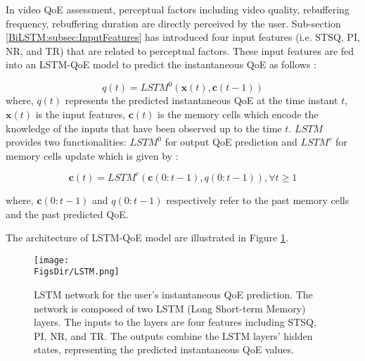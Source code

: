 In video QoE assessment, perceptual factors \citep{Survey_QoE} including video quality, rebuffering frequency, rebuffering duration are directly perceived by the user.
Sub-section \ref{BiLSTM:subsec:InputFeatures} has introduced four input features (i.e. STSQ, PI, NR, and TR) that are related to perceptual factors.
These input features are fed into an LSTM-QoE model \citep{QoEModel_LSTM} to predict the instantaneous QoE as follows \citep{QoEModel_LSTM}:

\begin{equation}
    q(t) = LSTM^{0}(\bm{x}(t), \bm{c}(t-1))
\end{equation}
where, $q(t)$ represents the predicted instantaneous QoE at the time instant $t$, $\bm{x}(t)$ is the input features, $\bm{c}(t)$ is the memory cells which encode the knowledge of the inputs that have been observed up to the time $t$. $LSTM$ provides two functionalities: $LSTM^{0}$ for output QoE prediction and $LSTM^{c}$ for memory cells update which is given by  \citep{QoEModel_LSTM}:

\begin{equation}
    \bm{c}(t) = LSTM^{c}(\bm{c}(0:t-1), q(0:t-1)), \forall t \ge 1
\end{equation}

where, $\bm{c}(0:t-1)$ and $q(0:t-1)$ respectively refer to the past memory cells and the past predicted QoE.


The architecture of LSTM-QoE model are illustrated in Figure \ref{fig:LSTM}.

\begin{figure}[tb]
  \begin{center}
    \texttt{[image: \\FigsDir/LSTM.png]}
  \end{center}
  \caption{LSTM network \citep{QoEModel_LSTM} for the user's instantaneous QoE prediction. The network is composed of two LSTM (Long Short-term Memory) layers. The inputs to the layers are four features including STSQ, PI, NR, and TR. The outputs combine the LSTM layers' hidden states, representing the predicted instantaneous QoE values.}
  \label{fig:LSTM}
\end{figure}